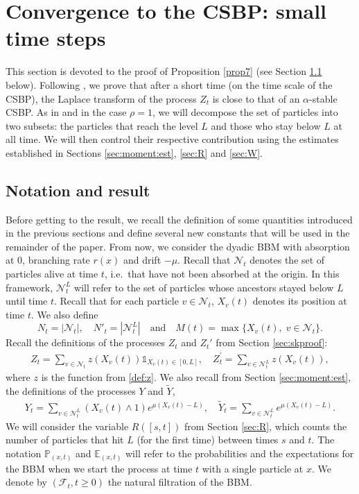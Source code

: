 \documentclass[11pt]{article}
\theoremstyle{plain}
\begin{document}


\section{Convergence to the CSBP: small time steps}\label{sec:smallts} 
\setcounter{equation}{0}
This section is devoted to the proof of Proposition \ref{prop7} (see Section \ref{sec:notation6} below). Following \cite{Maillard:2020aa}, we prove that after a short time (on the time scale of the CSBP), the Laplace transform of the process $Z_t$ is close to that of an $\alpha$-stable CSBP. As in \cite{Maillard:2020aa} and \cite{Berestycki2010} in the case $\rho=1$, we will decompose the set of particles into two subsets: the particles that reach the level $L$ and those who stay below $L$ at all time. We will then control their respective contribution using the estimates established in Sections \ref{sec:moment:est}, \ref{sec:R} and \ref{sec:W}.


\subsection{Notation and result}\label{sec:notation6}
Before getting to the result, we recall the definition of some quantities introduced in the previous sections and define several new constants that will be used in the remainder of the paper. 
From now, we consider the dyadic BBM with absorption at $0$, branching rate $r(x)$ and drift $-\mu$. Recall that $\mathcal{N}_t$ denotes the set of particles alive at time $t$, i.e.~that have not been absorbed at the origin. In this framework,  $\mathcal{N}_t^{L}$ will refer to the set of particles whose ancestors stayed below $L$ until time $t$. Recall that for each particle $v\in\mathcal{N}_t$, $X_v(t)$ denotes its position at time $t$. We also define
\begin{equation}
N_t=|\mathcal{N}_t|, \quad N'_t=|\mathcal{N}^L_t| \quad \text{and} \quad M(t)=\max\{X_v(t), \; v\in\mathcal{N}_t\}.\label{def:Nt}
\end{equation}
Recall the definitions of the processes $Z_t$ and $Z_t'$ from Section \ref{sec:skproof}:
\begin{align}
Z_t=\sum_{v\in \mathcal{N}_t}z(X_v(t))\mathbb{1}_{X_v(t)\in[0,L]}, \quad 
Z_t^{'}=\sum_{v\in \mathcal{N}^{L}_t}z(X_v(t)),\label{def:Zt}
\end{align}
where $z$ is the function from \eqref{def:z}. We also recall from Section \ref{sec:moment:est}, the definitions of the processes $Y$ and $\tilde Y,$
\begin{align}
Y_t=\sum_{v\in \mathcal{N}^{L}_t}(X_v(t)\wedge 1)e^{\mu(X_v(t)-{L})},\quad \tilde Y_t^{}=\sum_{v\in \mathcal{N}^{L}_t} e^{\mu(X_v(t)-{L})}.\label{def:Yt}
\end{align}
We will consider the variable $R([s,t])$ from Section \ref{sec:R}, which counts the number of particles that hit $L$ (for the first time) between times $s$ and $t$.
The notation $\mathbb{P}_{(x,t)}$ and $\mathbb{E}_{(x,t)}$ will refer to the probabilities and the expectations for the BBM when we start the process at time $t$ with a single particle at $x$. We denote by $(\mathcal{F}_t,t\geqslant 0)$ the natural filtration of the BBM.
\end{document}
